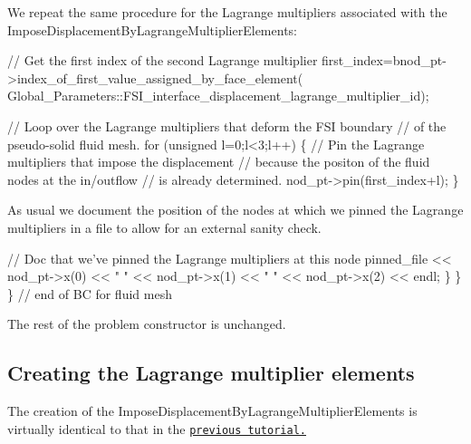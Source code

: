 We repeat the same procedure for the Lagrange multipliers associated with the {\ttfamily Impose\+Displacement\+By\+Lagrange\+Multiplier\+Elements\+:} 


\begin{DoxyCodeInclude}

       
       \textcolor{comment}{// Get the first index of the second Lagrange multiplier }
       first\_index=bnod\_pt->index\_of\_first\_value\_assigned\_by\_face\_element(
        Global\_Parameters::FSI\_interface\_displacement\_lagrange\_multiplier\_id);

       \textcolor{comment}{// Loop over the Lagrange multipliers that deform the FSI boundary}
       \textcolor{comment}{// of the pseudo-solid fluid mesh.}
       \textcolor{keywordflow}{for} (\textcolor{keywordtype}{unsigned} l=0;l<3;l++)
        \{
         \textcolor{comment}{// Pin the Lagrange multipliers that impose the displacement}
         \textcolor{comment}{// because the positon of the fluid nodes at the in/outflow}
         \textcolor{comment}{// is already determined. }
         nod\_pt->pin(first\_index+l);
        \}

\end{DoxyCodeInclude}


As usual we document the position of the nodes at which we pinned the Lagrange multipliers in a file to allow for an external sanity check.


\begin{DoxyCodeInclude}

       \textcolor{comment}{// Doc that we've pinned the Lagrange multipliers at this node}
       pinned\_file << nod\_pt->x(0) << \textcolor{stringliteral}{" "}
                   << nod\_pt->x(1) << \textcolor{stringliteral}{" "}
                   << nod\_pt->x(2) << endl;
      \}
    \}
  \} \textcolor{comment}{// end of BC for fluid mesh}

\end{DoxyCodeInclude}


The rest of the problem constructor is unchanged.



\hypertarget{index_face_elements_code}{}\subsection{Creating the Lagrange multiplier elements}\label{index_face_elements_code}
The creation of the {\ttfamily Impose\+Displacement\+By\+Lagrange\+Multiplier\+Elements} is virtually identical to that in the \href{../../unstructured_three_d_fsi/html/index.html}{\tt previous tutorial.}


